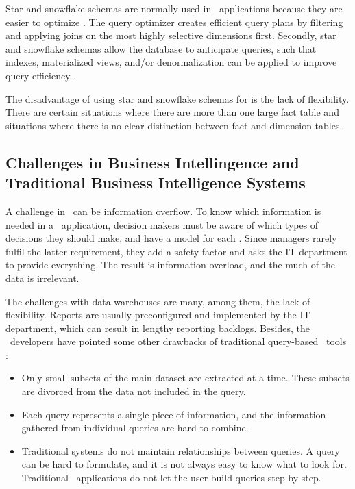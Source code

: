 Star and snowflake schemas are normally used in \bi~applications because they are easier to optimize \cite{Lamb2012-kg}. The query optimizer creates efficient query plans by filtering and applying joins on the most highly selective dimensions first. Secondly, star and snowflake schemas allow the database to anticipate queries, such that indexes, materialized views, and/or denormalization can be applied to improve query efficiency \cite{Barber2012-xt}.

The disadvantage of using star and snowflake schemas for \bi is the lack of flexibility. There are certain situations where there are more than one large fact table and situations where there is no clear distinction between fact and dimension tables.

\subsection{Challenges in Business Intellingence and Traditional Business Intelligence Systems} 
\label{sub:Challenges in Business Intelligence and Traditional Business Intelligence Systems}
A challenge in \bi~can be information overflow. To know which information is needed in a \bi~application, decision makers must be aware of which types of decisions they should make, and have a model for each \cite{Ackoff1999-wk}. Since managers rarely fulfil the latter requirement, they add a safety factor and asks the IT department to provide everything. The result is information overload, and the much of the data is irrelevant. 

The challenges with data warehouses are many, among them, the lack of flexibility. Reports are usually preconfigured and implemented by the IT department, which can result in lengthy reporting backlogs. Besides, the \qlikview~developers have pointed some other drawbacks of traditional query-based \bi~tools \cite{Qlik2010-ya}:
\begin{itemize}
  \item Only small subsets of the main dataset are extracted at a time. These subsets are divorced from the data not included in the query.
  \item Each query represents a single piece of information, and the information gathered from individual queries are hard to combine.
  \item Traditional systems do not maintain relationships between queries. A query can be hard to formulate, and it is not always easy to know what to look for. Traditional \bi~applications do not let the user build queries step by step.
\end{itemize}


